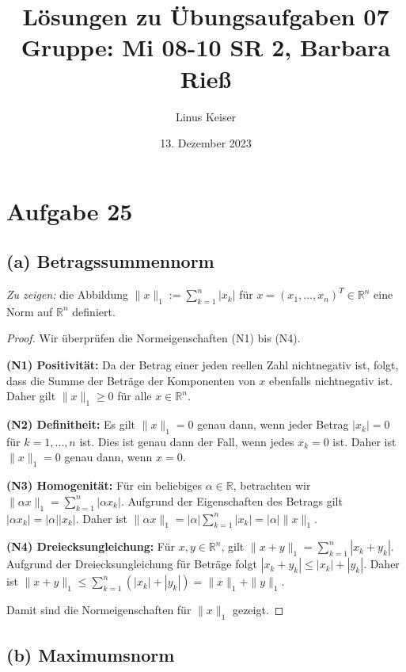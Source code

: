 \documentclass{article}
\title{Lösungen zu Übungsaufgaben 07 \\ \small Gruppe: Mi 08-10 SR 2, Barbara Rieß}
\author{Linus Keiser}
\date{13. Dezember 2023}
\theoremstyle{definition}
\theoremstyle{remark}
\begin{document}
\maketitle
\section*{Aufgabe 25}

\subsection*{(a) Betragssummennorm}

\textit{Zu zeigen:} die Abbildung \( \| x \|_1 := \sum_{k=1}^{n} |x_k| \) für \( x = (x_1, \ldots, x_n)^T \in \mathbb{R}^n \) eine Norm auf \( \mathbb{R}^n \) definiert.

\begin{proof} Wir überprüfen die Normeigenschaften (N1) bis (N4).

	\textbf{(N1) Positivität:}
	Da der Betrag einer jeden reellen Zahl nichtnegativ ist, folgt, dass die Summe der Beträge der Komponenten von \( x \) ebenfalls nichtnegativ ist. Daher gilt \( \| x \|_1 \geq 0 \) für alle \( x \in \mathbb{R}^n \).

	\textbf{(N2) Definitheit:}
	Es gilt \( \| x \|_1 = 0 \) genau dann, wenn jeder Betrag \( |x_k| = 0 \) für \( k = 1, \ldots, n \) ist. Dies ist genau dann der Fall, wenn jedes \( x_k = 0 \) ist. Daher ist \( \| x \|_1 = 0 \) genau dann, wenn \( x = 0 \).

	\textbf{(N3) Homogenität:}
	Für ein beliebiges \( \alpha \in \mathbb{R} \), betrachten wir \( \| \alpha x \|_1 = \sum_{k=1}^{n} |\alpha x_k| \). Aufgrund der Eigenschaften des Betrags gilt \( |\alpha x_k| = |\alpha||x_k| \). Daher ist \( \| \alpha x \|_1 = |\alpha| \sum_{k=1}^{n} |x_k| = |\alpha| \| x \|_1 \).

	\textbf{(N4) Dreiecksungleichung:}
	Für \( x, y \in \mathbb{R}^n \), gilt \( \| x + y \|_1 = \sum_{k=1}^{n} |x_k + y_k| \). Aufgrund der Dreiecksungleichung für Beträge folgt \( |x_k + y_k| \leq |x_k| + |y_k| \). Daher ist \( \| x + y \|_1 \leq \sum_{k=1}^{n} (|x_k| + |y_k|) = \| x \|_1 + \| y \|_1 \).

	Damit sind die Normeigenschaften für \( \| x \|_1 \) gezeigt.
\end{proof}

\subsection*{(b) Maximumsnorm}
\end{document}
